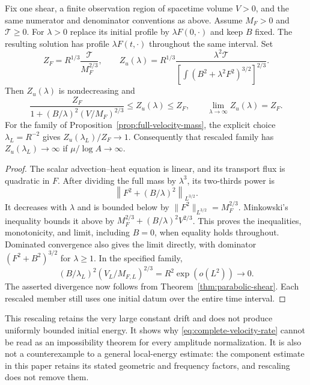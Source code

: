 \begin{proposition}\label{prop:amplitude-scaling}
Fix one shear, a finite observation region of spacetime volume $V>0$,
and the same numerator and denominator conventions as above.  Assume
$M_F>0$ and $\mathcal T\ge0$.  For $\lambda>0$ replace its initial
profile by $\lambda F(0,\cdot)$ and keep $B$ fixed.  The resulting
solution has profile $\lambda F(t,\cdot)$ throughout the same interval.
Set
\[
 Z_F=R^{1/3}\frac{\mathcal T}{M_F^{2/3}},\qquad
 Z_u(\lambda)=R^{1/3}
  \frac{\lambda^2\mathcal T}
  {\left[\int(B^2+\lambda^2F^2)^{3/2}\right]^{2/3}}.
\]
Then $Z_u(\lambda)$ is nondecreasing and
\begin{equation}\label{eq:amplitude-sandwich}
 \frac{Z_F}{1+(B/\lambda)^2(V/M_F)^{2/3}}
 \le Z_u(\lambda)\le Z_F,
 \qquad \lim_{\lambda\to\infty}Z_u(\lambda)=Z_F.
\end{equation}
For the family of Proposition~\ref{prop:full-velocity-mass}, the
explicit choice $\lambda_L=R^{-2}$ gives
$Z_u(\lambda_L)/Z_F\to1$.  Consequently that rescaled family has
$Z_u(\lambda_L)\to\infty$ if $\mu/\log A\to\infty$.
\end{proposition}
\begin{proof}
The scalar advection--heat equation is linear, and its transport flux
is quadratic in $F$.  After dividing the full mass by $\lambda^3$,
its two-thirds power is
\[
 \left\|F^2+(B/\lambda)^2\right\|_{L^{3/2}}.
\]
It decreases with $\lambda$ and is bounded below by
$\|F^2\|_{L^{3/2}}=M_F^{2/3}$.  Minkowski's inequality bounds it
above by $M_F^{2/3}+(B/\lambda)^2V^{2/3}$.  This proves the
inequalities, monotonicity, and limit, including $B=0$, when equality
holds throughout.  Dominated convergence also gives the limit directly,
with dominator $(F^2+B^2)^{3/2}$ for $\lambda\ge1$.
In the specified family,
\[
 (B/\lambda_L)^2(V_L/M_{F,L})^{2/3}
       =R^2\exp(o(L^2))\longrightarrow0.
\]
The asserted divergence now follows from
Theorem~\ref{thm:parabolic-shear}.  Each rescaled member still uses
one initial datum over the entire time interval.
\end{proof}

This rescaling retains the very large constant drift and does not
produce uniformly bounded initial energy.  It shows why
\eqref{eq:complete-velocity-rate} cannot be read as an impossibility
theorem for every amplitude normalization.  It is also not a
counterexample to a general local-energy estimate: the component
estimate in this paper retains its stated geometric and frequency
factors, and rescaling does not remove them.

